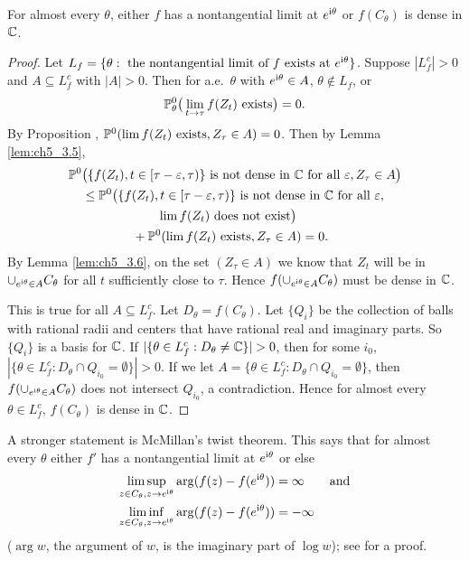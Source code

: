 \begin{theorem}[Plessner]\label{thm:ch5_3.7}
For almost every $\theta$, either $f$ has a nontangential limit at $e^{\im\theta}$ or $f(C_\theta)$ is dense in $\C$.
\end{theorem}

\begin{proof}
Let $L_f = \{\theta :~\text{the nontangential limit of}~f~\text{exists at}~e^{\im\theta}\}$. Suppose $|L_f^c| > 0$ and $A \subseteq L_f^c$ with $|A| > 0$. Then for a.e.\ $\theta$ with $e^{\im\theta} \in A$, $\theta \notin L_f$, or
\[
    \P_\theta^0\big(\lim_{t\to\tau} f(Z_t)~\text{exists}\big) = 0.
\]
By Proposition , $\P^0(\lim f(Z_t)~\text{exists}, Z_\tau \in A) = 0$. Then by Lemma \ref{lem:ch5_3.5},
\begin{align*}
    \P^0&\big(\{f(Z_t), t \in [\tau-\epsilon,\tau)\}~\text{is not dense in}~\C~\text{for all}~\epsilon, Z_\tau \in A\big) \\
    &\leq \P^0\big(\{f(Z_t), t \in [\tau-\epsilon,\tau)\}~\text{is not dense in}~ \C~\text{for all}~\epsilon, \\
    &\qquad\qquad\qquad\lim f(Z_t)~\text{does not exist}\big) \\
    &\qquad\qquad+ \P^0(\lim f(Z_t)~\text{exists}, Z_\tau \in A) = 0.
\end{align*}
By Lemma \ref{lem:ch5_3.6}, on the set $(Z_\tau \in A)$ we know that $Z_t$ will be in $\cup_{e^{\im\theta}\in A}C_\theta$ for all $t$ sufficiently close to $\tau$. Hence $f(\cup_{e^{\im\theta}\in A}C_\theta)$ must be dense in $\C$.

This is true for all $A \subseteq L_f^c$. Let $D_\theta = f(C_\theta)$. Let $\{Q_i\}$ be the collection of balls with rational radii and centers that have rational real and imaginary parts. So $\{Q_i\}$ is a basis for $\C$. If $|\{\theta \in L_f^c : D_\theta \neq \C\}| > 0$, then for some $i_0$, $|\{\theta \in L_f^c : D_\theta \cap Q_{i_0} = \emptyset\}| > 0$. If we let $A = \{\theta \in L_f^c : D_\theta \cap Q_{i_0} = \emptyset\}$, then $f(\cup_{e^{\im\theta}\in A}C_\theta)$ does not intersect $Q_{i_0}$, a contradiction. Hence for almost every $\theta \in L_f^c$, $f(C_\theta)$ is dense in $\C$.
\end{proof}


A stronger statement is McMillan's twist theorem. This says that for almost every $\theta$ either $f'$ has a nontangential limit at $e^{\im\theta}$ or else
\begin{align}\label{eq:ch5_3.17}
\limsup_{z\in C_\theta,z\to e^{\im\theta}} \arg(f(z) - f(e^{\im\theta})) &= \infty \qquad \text{and} \\
\liminf_{z\in C_\theta,z\to e^{\im\theta}} \arg(f(z) - f(e^{\im\theta})) &= -\infty \notag
\end{align}
($\arg w$, the argument of $w$, is the imaginary part of $\log w$); see \cite{Pommerenke1992} for a proof.

